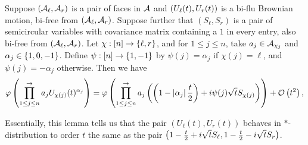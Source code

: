 \begin{lemma}
	\label{lem:ubmest}
	Suppose $(\mathcal{A}_\ell, \mathcal{A}_r)$ is a pair of faces in $\mathcal{A}$ and $\left(U_\ell(t), U_r(t)\right)$ is a bi-flu Brownian motion, bi-free from $(\mathcal{A}_\ell, \mathcal{A}_r)$.
	Suppose further that $(S_\ell, S_r)$ is a pair of semicircular variables with covariance matrix containing a $1$ in every entry, also bi-free from $(\mathcal{A}_\ell, \mathcal{A}_r)$.
	Let $\chi : [n] \to \left\{\ell, r\right\}$, and for $1 \leq j \leq n$, take $a_j \in \mathcal{A}_{\chi_j}$ and $\alpha_j \in \left\{1, 0, -1\right\}$.
	Define $\psi : [n] \to \left\{1, -1\right\}$ by $\psi(j) = \alpha_j$ if $\chi(j) = \ell$, and $\psi(j) = -\alpha_j$ otherwise.
	Then we have
	$$\varphi\left(\prod_{1\leq j \leq n}^{\rightarrow} a_jU_{\chi(j)}(t)^{\alpha_j}\right)
	= \varphi\left(\prod_{1\leq j \leq n}^{\rightarrow} a_j\left(\left(1-\left|\alpha_j\right|\frac{t}{2}\right)+i\psi(j)\sqrt{t}S_{\chi(j)}\right)\right) + \mathcal{O}\left(t^2\right),$$
\end{lemma}

Essentially, this lemma tells us that the pair $(U_\ell(t), U_r(t))$ behaves in $*$-distribution to order $t$ the same as the pair $\left(1-\frac{t}2 + i\sqrt{t}S_\ell, 1-\frac{t}2 - i\sqrt{t}S_r\right)$.


